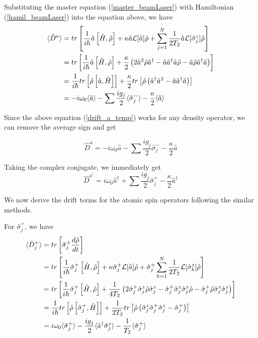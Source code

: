 \documentclass{article}
\newcommand{\lindblad}{\mathcal{L}}
\newcommand{\szj}{\hat{\sigma}^z_j}
\newcommand{\spj}{\hat{\sigma}^+_j}
\newcommand{\smj}{\hat{\sigma}^-_j}
\begin{document}
Substituting the master equation (\ref{master_beamLaser}) with Hamiltonian (\ref{hamil_beamLaser}) into the equation above, we have
\begin{align}
\label{drift_a_temp}
    \notag \langle \hat{D}^a \rangle &= tr\left[\frac{1}{i\hbar}\Hat{a}\left[\Hat{H}, \Hat{\rho}\right]+\kappa\Hat{a}\lindblad[\hat{a}]\hat{\rho}+\sum^{N}_{j=1}\frac{1}{2T_2}\Hat{a}\lindblad[\hat{\sigma}^z_j]\hat{\rho}\right]\\
    \notag &= tr\left[\frac{1}{i\hbar}\Hat{a}\left[\Hat{H}, \Hat{\rho}\right]+\frac{\kappa}{2}\left(2\Hat{a}^2\Hat{\rho}\Hat{a}^\dagger-\Hat{a}\hat{a}^\dagger\Hat{a}\Hat{\rho}-\Hat{a}\Hat{\rho}\Hat{a}^\dagger\Hat{a}\right)\right]\\
    \notag &= \frac{1}{i\hbar}tr\left[\Hat{\rho}\left[\Hat{a}, \Hat{H}\right]\right]+\frac{\kappa}{2}tr\left[\hat{\rho}\left(\Hat{a}^\dagger\hat{a}^2-\Hat{a}\hat{a}^\dagger\Hat{a}\right)\right]\\
    &= -i\omega_0 \langle \hat{a} \rangle-\sum\frac{ig_j}{2}\langle \smj \rangle - \frac{\kappa}{2}\langle \hat{a} \rangle
\end{align}

Since the above equation (\ref{drift_a_temp}) works for any density operator, we can remove the average sign and get

\begin{equation}
\label{qle_a_drift}
    \hat{D}^a = -i\omega_0 \hat{a}-\sum\frac{ig_j}{2} \smj  - \frac{\kappa}{2} \hat{a}
\end{equation}

Taking the complex conjugate, we immediately get
\begin{equation}
\label{qle_aDag_drift}
    \hat{D}^{a^\dagger} = i\omega_0 \hat{a}^\dagger+\sum\frac{ig_j}{2} \spj  - \frac{\kappa}{2} \hat{a}^\dagger
\end{equation}

We now derive the drift terms for the atomic spin operators following the similar methods.

For $\spj$, we have
\begin{align}
    \notag\langle \Hat{D}^+_j \rangle &= tr\left[\spj \frac{d\hat{\rho}}{dt}\right]\\
    \notag &= tr\left[\frac{1}{i\hbar}\spj \left[\Hat{H}, \Hat{\rho}\right]+\kappa\spj\lindblad[\hat{a}]\hat{\rho}+\spj\sum^{N}_{k=1}\frac{1}{2T_2}\lindblad[\hat{\sigma}^z_k]\hat{\rho}\right]\\
    \notag &= tr\left[\frac{1}{i\hbar}\spj\left[\Hat{H}, \Hat{\rho}\right]+\frac{1}{4T_2}\left(2\spj\hat{\sigma}^z_j\Hat{\rho}\hat{\sigma}^z_j-\spj\hat{\sigma}^z_j\hat{\sigma}^z_j\Hat{\rho}-\spj\Hat{\rho}\hat{\sigma}^z_j\hat{\sigma}^z_j\right)\right]\\
    \notag &= \frac{1}{i\hbar}tr\left[\Hat{\rho}\left[\spj, \Hat{H}\right]\right]+\frac{1}{2T_2}tr\left[\hat{\rho}\left(\szj\spj\szj-\spj\right)\right]\\
    &= i\omega_0 \langle \spj \rangle-\frac{ig_j}{2}\langle \hat{a}^\dagger \szj \rangle - \frac{1}{T_2}\langle \spj \rangle
\end{align}
\end{document}
